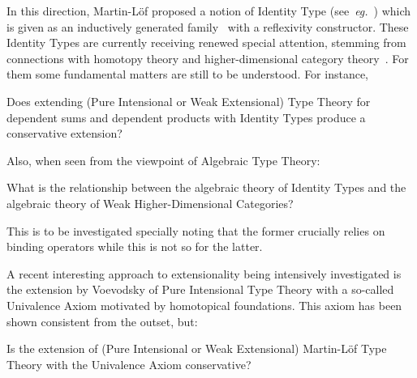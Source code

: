 \documentclass[11pt,twocolumn]{article}
\newcounter{CC}
\newenvironment{resenumerate}
  {\begin{list}{[\textbf{\arabic{CC}]}}
  {\usecounter{CC}
   \setlength{\topsep}{2pt}
   \setlength{\partopsep}{2pt}
   \setlength{\itemsep}{2.5pt}
   \setlength{\parsep}{2.5pt}
   \setlength{\leftmargin}{1.65em}
   \setlength{\labelwidth}{1.15em}
 }}
  {\end{list}}
\newcommand{\hide}[1]{}
\newcommand{\eg}{\emph{eg.}}
\begin{document}
In this direction, Martin-L\"of proposed a notion of Identity Type
(see~\eg~\cite{ProgMLTT}) which is given as an inductively generated
family~\cite{DybjerIF} with a reflexivity constructor.  These Identity Types
are currently receiving renewed special attention, stemming from connections
with homotopy theory and higher-dimensional category
theory~\cite{UnivalentProgramme}.  For them some fundamental matters are still
to be understood.  For instance, 
\hide{
whether the introduced intensional identity
affects 
judgemental equality.
Precisely,
}
\begin{resenumerate}\setcounter{CC}{4}
\item
  Does extending (Pure Intensional or Weak Extensional) Type Theory for
  dependent sums and dependent products with Identity Types produce a
  conservative extension?
\end{resenumerate}
Also, when seen from the viewpoint of Algebraic Type Theory:
\begin{resenumerate}\setcounter{CC}{5}
\item 
  What is the relationship between the algebraic theory of Identity Types and
  the algebraic theory of Weak Higher-Dimensional Categories?
\end{resenumerate}
This is to be investigated specially noting that the former crucially relies
on binding operators while this is not so for the latter.

A recent interesting approach to extensionality being intensively
investigated is the extension by Voevodsky of Pure Intensional Type Theory
with a so-called Univalence Axiom %
motivated by homotopical foundations.  This axiom has been shown consistent
from the outset, but:
\begin{resenumerate}\setcounter{CC}{6}
\item 
  Is the extension of (Pure Intensional or Weak Extensional) Martin-L\"of Type
  Theory with the Univalence Axiom conservative?
\end{resenumerate}
\end{document}
